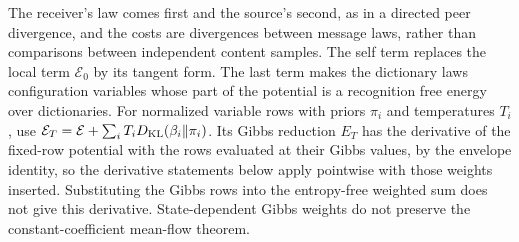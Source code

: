 \documentclass[11pt,letterpaper]{report}
\begin{document}
The receiver's law comes first and the source's second, as in a directed peer divergence, and the costs are divergences between message laws, rather than comparisons between independent content samples. The self term replaces the local term $\mathcal E_0$ by its tangent form. The last term makes the dictionary laws configuration variables whose part of the potential is a recognition free energy over dictionaries. For normalized variable rows with priors $\pi_i$ and temperatures $T_i$, use $\mathcal E_T=\mathcal E+\sum_iT_iD_{\mathrm{KL}}(\beta_i\Vert\pi_i)$. Its Gibbs reduction $E_T$ has the derivative of the fixed-row potential with the rows evaluated at their Gibbs values, by the envelope identity, so the derivative statements below apply pointwise with those weights inserted. Substituting the Gibbs rows into the entropy-free weighted sum does not give this derivative. State-dependent Gibbs weights do not preserve the constant-coefficient mean-flow theorem.
\end{document}
